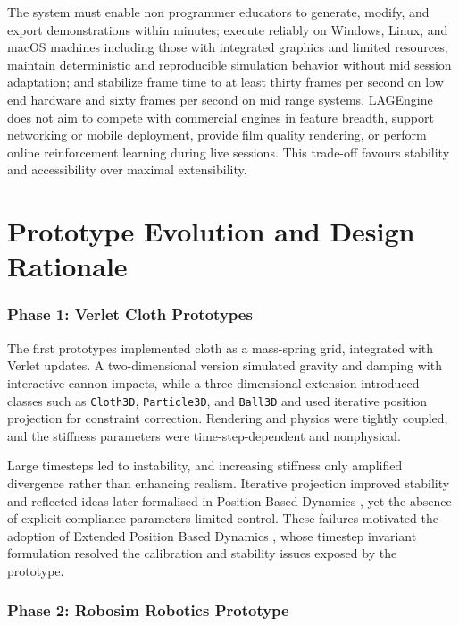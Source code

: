 \documentclass[9pt,openany]{extbook}
\begin{document}
The system must enable non programmer educators to generate, modify, and export demonstrations within minutes; execute reliably on Windows, Linux, and macOS machines including those with integrated graphics and limited resources; maintain deterministic and reproducible simulation behavior without mid session adaptation; and stabilize frame time to at least thirty frames per second on low end hardware and sixty frames per second on mid range systems. LAGEngine does not aim to compete with commercial engines in feature breadth, support networking or mobile deployment, provide film quality rendering, or perform online reinforcement learning during live sessions. This trade-off favours stability and accessibility over maximal extensibility.

\chapter{Prototype Evolution and Design Rationale}
\label{sec:prototype}

\subsection{Phase 1: Verlet Cloth Prototypes}

The first prototypes implemented cloth as a mass-spring grid, integrated with Verlet updates. A two-dimensional version simulated gravity and damping with interactive cannon impacts, while a three-dimensional extension introduced classes such as \texttt{Cloth3D}, \texttt{Particle3D}, and \texttt{Ball3D} and used iterative position projection for constraint correction. Rendering and physics were tightly coupled, and the stiffness parameters were time-step-dependent and nonphysical.

Large timesteps led to instability, and increasing stiffness only amplified divergence rather than enhancing realism. Iterative projection improved stability and reflected ideas later formalised in Position Based Dynamics \cite{muller2007pbd}, yet the absence of explicit compliance parameters limited control. These failures motivated the adoption of Extended Position Based Dynamics \cite{macklin2016xpbd}, whose timestep invariant formulation resolved the calibration and stability issues exposed by the prototype.

\subsection{Phase 2: Robosim Robotics Prototype}
\end{document}
